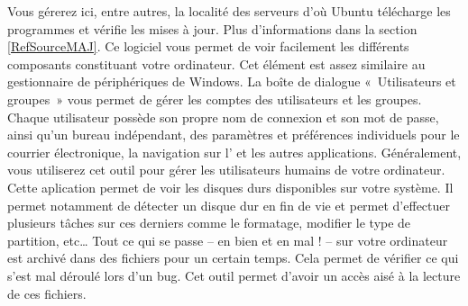 Vous gérerez ici, entre autres, la localité des serveurs d'où Ubuntu télécharge les programmes et vérifie les mises à jour. Plus d'informations dans la section \ref{RefSourceMAJ}.
Ce logiciel vous permet de voir facilement les différents composants constituant votre ordinateur. Cet élément est assez similaire au gestionnaire de périphériques de Windows.
La boîte de dialogue «~Utilisateurs et groupes~» vous permet de gérer les comptes des utilisateurs et les groupes. Chaque utilisateur possède son propre nom de connexion et son mot de passe, ainsi qu'un bureau indépendant, des paramètres et préférences individuels pour le courrier électronique, la navigation sur l' et les autres applications. Généralement, vous utiliserez cet outil pour gérer les utilisateurs humains de votre ordinateur.
Cette aplication permet de voir les disques durs disponibles sur votre système. Il permet notamment de détecter un disque dur en fin de vie et permet d'effectuer plusieurs tâches sur ces derniers comme le formatage, modifier le type de partition, etc\ldots{}
Tout ce qui se passe -- en bien et en mal ! -- sur votre ordinateur est archivé dans des fichiers  pour un certain temps. Cela permet de vérifier ce qui s'est mal déroulé lors d'un bug. Cet outil permet d'avoir un accès aisé à la lecture de ces fichiers.
